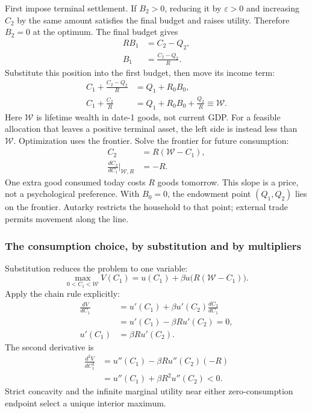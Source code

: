 First impose terminal settlement. If $B_2>0$, reducing it by $\varepsilon>0$
and increasing $C_2$ by the same amount satisfies the final budget and raises
utility. Therefore $B_2=0$ at the optimum. The final budget gives
\begin{align}
 RB_1&=C_2-Q_2,\\
 B_1&=\frac{C_2-Q_2}{R}.
\end{align}
Substitute this position into the first budget, then move its income term:
\begin{align}
 C_1+\frac{C_2-Q_2}{R}&=Q_1+R_0B_0,\\
 C_1+\frac{C_2}{R}&=Q_1+R_0B_0+\frac{Q_2}{R}
 \equiv\mathcal W.\label{eq:open-pv-two}
\end{align}
Here $\mathcal W$ is lifetime wealth in date-1 goods, not current GDP.
For a feasible allocation that leaves a positive terminal asset, the left
side is instead less than $\mathcal W$. Optimization uses the frontier.
Solve the frontier for future consumption:
\begin{align}
 C_2&=R(\mathcal W-C_1),\\
 \frac{dC_2}{dC_1}\bigg|_{\mathcal W,R}&=-R.
\end{align}
One extra good consumed today costs $R$ goods tomorrow. This slope is a price,
not a psychological preference. With $B_0=0$, the endowment point $(Q_1,Q_2)$
lies on the frontier. Autarky restricts the household to that point; external
trade permits movement along the line.

\subsubsection{The consumption choice, by substitution and by multipliers}

Substitution reduces the problem to one variable:
\begin{equation}
 \max_{0<C_1<\mathcal W}
 V(C_1)=u(C_1)+\beta u\bigl(R(\mathcal W-C_1)\bigr).
\end{equation}
Apply the chain rule explicitly:
\begin{align}
 \frac{dV}{dC_1}
 &=u'(C_1)+\beta u'(C_2)\frac{dC_2}{dC_1}\\
 &=u'(C_1)-\beta R u'(C_2)=0,\\
 u'(C_1)&=\beta R u'(C_2).\label{eq:open-euler-two}
\end{align}
The second derivative is
\begin{align}
 \frac{d^2V}{dC_1^2}
 &=u''(C_1)-\beta R u''(C_2)(-R)\\
 &=u''(C_1)+\beta R^2u''(C_2)<0.
\end{align}
Strict concavity and the infinite marginal utility near either zero-consumption
endpoint select a unique interior maximum.

